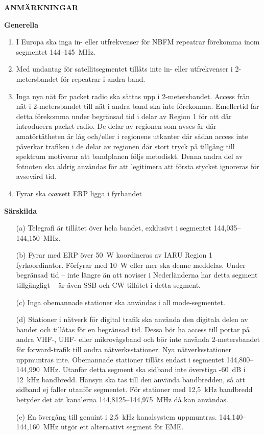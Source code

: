 \textbf{ANMÄRKNINGAR}

\textbf{Generella}
\begin{enumerate}[label=\alph*.]
\item I Europa ska inga in- eller utfrekvenser för NBFM repeatrar
  förekomma inom segmentet 144--145~MHz.
\item Med undantag för satellitsegmentet tillåts inte in- eller
  utfrekvenser i 2-metersbandet för repeatrar i andra band.
\item Inga nya nät för packet radio ska sättas upp i 2-metersbandet.
  Access från nät i 2-metersbandet till nät i andra band ska inte förekomma.
  Emellertid får detta förekomma under begränsad tid i delar av Region 1
  för att där introducera packet radio.
  De delar av regionen som avses är där amatörtätheten är låg och/eller
  i regionens utkanter där sådan access inte påverkar trafiken i de delar
  av regionen där stort tryck på tillgång till spektrum motiverar att
  bandplanen följs metodiskt.
  Denna andra del av fotnoten ska aldrig användas för att legitimera
  att första stycket ignoreras för avsevärd tid.
\item Fyrar ska oavsett ERP ligga i fyrbandet
\end{enumerate}

\textbf{Särskilda}
\begin{itemize}

\item[(a)] Telegrafi är tillåtet över hela bandet, exklusivt i segmentet
  144,035--144,150~MHz.

\item[(b)] Fyrar med ERP över 50~W koordineras av IARU Region 1 fyrkoordinator.
  Förfyrar med 10~W eller mer ska denne meddelas. Under begränsad tid -- inte
  längre än att noviser i Nederländerna har detta segment tillgängligt -- är
  även SSB och CW tillåtet i detta segment.

\item[(c)] Inga obemannade stationer ska användas i all mode-segmentet.

\item[(d)] Stationer i nätverk för digital trafik ska använda den
digitala delen av bandet och tillåtas för en begränsad tid.
Dessa bör ha access till portar på andra VHF-, UHF- eller mikrovågsband och bör
inte använda 2-metersbandet för forward-trafik till andra nätverksstationer.
Nya nätverksstationer uppmuntras inte.
Obemannade stationer tillåts endast i segmentet 144,800--144,990~MHz.
Utanför detta segment ska sidband inte överstiga -60~dB i 12~kHz bandbredd.
Hänsyn ska tas till den använda bandbredden, så att sidband ej faller
utanför segmentet.
För stationer med 12,5~kHz bandbredd betyder det att kanalerna
144,8125--144,975~MHz då kan användas.

\item[(e)] En övergång till genuint i 2,5~kHz kanalsystem uppmuntras.
144,140--144,160~MHz utgör ett alternativt segment för EME.
\end{itemize}

